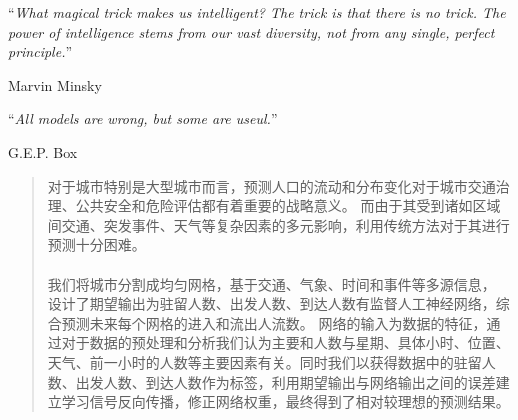 \documentclass[
11pt, %
english, %
singlespacing, %
headsepline, %
]{MastersDoctoralThesis} %
\author{
 } %
\begin{document}
\frontmatter %

\pagestyle{plain} %





\cleardoublepage


\vspace*{0.2\textheight}

\noindent\enquote{\itshape What magical trick makes us intelligent? The trick is that there is no trick. The power of intelligence stems from our vast diversity, not from any single, perfect principle.}\bigbreak

\hfill Marvin Minsky

\vspace*{0.05\textheight}

\noindent\enquote{\itshape All models are wrong, but some are useul.}\bigbreak

\hfill G.E.P. Box


\begin{abstract}
\addchaptertocentry{\abstractname} %
对于城市特别是大型城市而言，预测人口的流动和分布变化对于城市交通治理、公共安全和危险评估都有着重要的战略意义。 而由于其受到诸如区域间交通、突发事件、天气等复杂因素的多元影响，利用传统方法对于其进行预测十分困难。\\
\\
我们将城市分割成均匀网格，基于交通、气象、时间和事件等多源信息，
设计了期望输出为驻留人数、出发人数、到达人数有监督人工神经网络，综合预测未来每个网格的进入和流出人流数。 网络的输入为数据的特征，通过对于数据的预处理和分析我们认为主要和人数与星期、具体小时、位置、天气、前一小时的人数等主要因素有关。同时我们以获得数据中的驻留人数、出发人数、到达人数作为标签，利用期望输出与网络输出之间的误差建立学习信号反向传播，修正网络权重，最终得到了相对较理想的预测结果。
\end{abstract}
\end{document}
